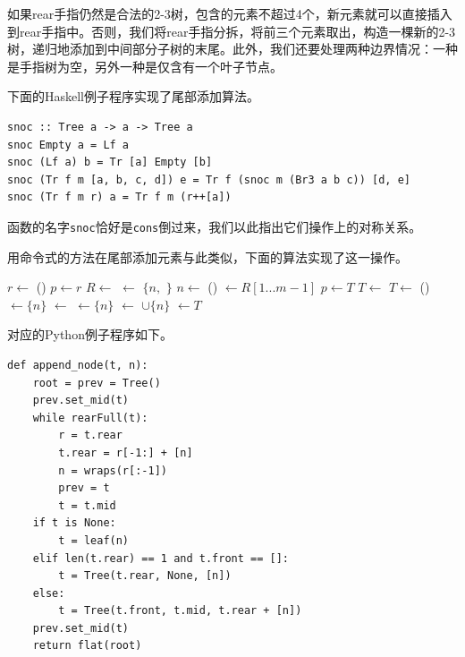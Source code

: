 \documentclass[b5paper]{ctexart}
\begin{document}
如果rear手指仍然是合法的2-3树，包含的元素不超过4个，新元素就可以直接插入到rear手指中。否则，我们将rear手指分拆，将前三个元素取出，构造一棵新的2-3树，递归地添加到中间部分子树的末尾。此外，我们还要处理两种边界情况：一种是手指树为空，另外一种是仅含有一个叶子节点。

下面的Haskell例子程序实现了尾部添加算法。

\lstset{language=Haskell}
\begin{lstlisting}[style=Haskell]
snoc :: Tree a -> a -> Tree a
snoc Empty a = Lf a
snoc (Lf a) b = Tr [a] Empty [b]
snoc (Tr f m [a, b, c, d]) e = Tr f (snoc m (Br3 a b c)) [d, e]
snoc (Tr f m r) a = Tr f m (r++[a])
\end{lstlisting}

函数的名字\texttt{snoc}恰好是\texttt{cons}倒过来，我们以此指出它们操作上的对称关系。

用命令式的方法在尾部添加元素与此类似，下面的算法实现了这一操作。

\begin{algorithmic}
  \State $r \gets $ ()
  \State $p \gets r$
  \State {}
    \State $R \gets $  
    \State {} $\gets$ $\{n, $  $\}$ 
    \State $n \gets$ ()
    \State {} $\gets R[1...m-1]$ 
    \State $p \gets T$
    \State $T \gets$ 
  \EndWhile
    \State $T \gets$ ()
    \State {} $\gets \{ n \}$
    \State {} $\gets$ 
    \State {} $\gets \{ n \}$
  \Else
    \State {} $\gets$  $\cup \{ n \} $
  \EndIf
  \State {} $\gets T$
  \State \Return {}
\EndFunction
\end{algorithmic}

对应的Python例子程序如下。

\lstset{language=Python}
\begin{lstlisting}
def append_node(t, n):
    root = prev = Tree()
    prev.set_mid(t)
    while rearFull(t):
        r = t.rear
        t.rear = r[-1:] + [n]
        n = wraps(r[:-1])
        prev = t
        t = t.mid
    if t is None:
        t = leaf(n)
    elif len(t.rear) == 1 and t.front == []:
        t = Tree(t.rear, None, [n])
    else:
        t = Tree(t.front, t.mid, t.rear + [n])
    prev.set_mid(t)
    return flat(root)
\end{lstlisting}
\end{document}
